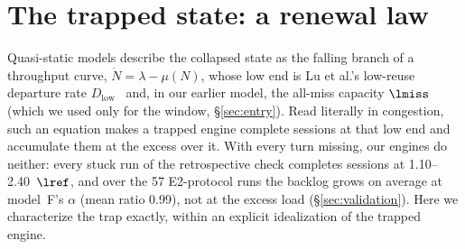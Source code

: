 \section{The trapped state: a renewal law}\label{sec:trap}

Quasi-static models describe the collapsed state as the falling branch of a throughput curve, $\dot N=\lambda-\mu(N)$,
whose low end is Lu et al.'s low-reuse departure rate $D_{\mathrm{low}}$~\citep{lu2026cachetrap} and, in our earlier model, the
all-miss capacity $\lmiss$ (which we used only for the window, \S\ref{sec:entry}). Read literally in congestion, such an equation
makes a trapped engine complete sessions at that low end and accumulate them at the excess over it. With every turn missing, our
engines do neither: every stuck run of the retrospective check completes sessions at 1.10--2.40~$\lref$, and over the 57 E2-protocol runs the backlog grows on
average at model~F's $\alpha$ (mean ratio 0.99), not at the excess load (\S\ref{sec:validation}). Here we characterize the trap exactly, within an explicit idealization of the trapped engine.

